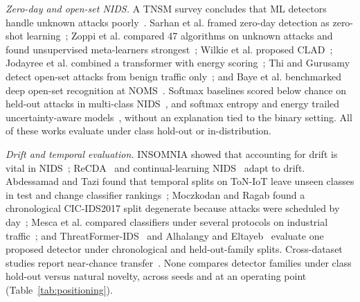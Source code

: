 \documentclass[conference]{IEEEtran}
\begin{document}
\emph{Zero-day and open-set NIDS.} A TNSM survey concludes that ML detectors handle unknown attacks poorly~\cite{sabeel2024}. Sarhan et al. framed zero-day detection as zero-shot learning~\cite{sarhan2023zeroday}; Zoppi et al. compared 47 algorithms on unknown attacks and found unsupervised meta-learners strongest~\cite{zoppi2023}; Wilkie et al. proposed CLAD~\cite{wilkie2026}; Jodayree et al. combined a transformer with energy scoring~\cite{jodayree2026}; Thi and Gurusamy detect open-set attacks from benign traffic only~\cite{thi2026}; and Baye et al. benchmarked deep open-set recognition at NOMS~\cite{baye2023}. Softmax baselines scored below chance on held-out attacks in multi-class NIDS~\cite{zhang2021ijmlc}, and softmax entropy and energy trailed uncertainty-aware models~\cite{talpini2024}, without an explanation tied to the binary setting. All of these works evaluate under class hold-out or in-distribution.

\emph{Drift and temporal evaluation.} INSOMNIA showed that accounting for drift is vital in NIDS~\cite{andresini2021}; ReCDA~\cite{yang2024recda} and continual-learning NIDS~\cite{zhang2025infocom} adapt to drift. Abdessamad and Tazi found that temporal splits on ToN-IoT leave unseen classes in test and change classifier rankings~\cite{abdessamad2026}; Moczkodan and Ragab found a chronological CIC-IDS2017 split degenerate because attacks were scheduled by day~\cite{moczkodan2026}; Mesca et al. compared classifiers under several protocols on industrial traffic~\cite{mesca2026}; and ThreatFormer-IDS~\cite{nayak2026} and Alhalangy and Eltayeb~\cite{alhalangy2026} evaluate one proposed detector under chronological and held-out-family splits. Cross-dataset studies report near-chance transfer~\cite{layeghy2023xdomain,cantone2024}. None compares detector families under class hold-out versus natural novelty, across seeds and at an operating point (Table~\ref{tab:positioning}).
\end{document}
